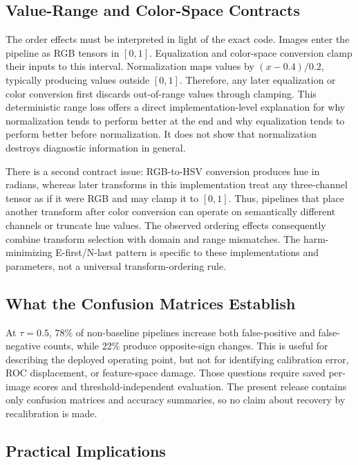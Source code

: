 \documentclass[preprint,review,12pt]{elsarticle}
\begin{document}
\subsection{Value-Range and Color-Space Contracts}
\label{subsec:mechanistic}

The order effects must be interpreted in light of the exact code. Images enter the pipeline as RGB tensors in $[0,1]$. Equalization and color-space conversion clamp their inputs to this interval. Normalization maps values by $(x-0.4)/0.2$, typically producing values outside $[0,1]$. Therefore, any later equalization or color conversion first discards out-of-range values through clamping. This deterministic range loss offers a direct implementation-level explanation for why normalization tends to perform better at the end and why equalization tends to perform better before normalization. It does not show that normalization destroys diagnostic information in general.

There is a second contract issue: RGB-to-HSV conversion produces hue in radians, whereas later transforms in this implementation treat any three-channel tensor as if it were RGB and may clamp it to $[0,1]$. Thus, pipelines that place another transform after color conversion can operate on semantically different channels or truncate hue values. The observed ordering effects consequently combine transform selection with domain and range mismatches. The harm-minimizing E-first/N-last pattern is specific to these implementations and parameters, not a universal transform-ordering rule.

\subsection{What the Confusion Matrices Establish}

At $\tau=0.5$, 78\% of non-baseline pipelines increase both false-positive and false-negative counts, while 22\% produce opposite-sign changes. This is useful for describing the deployed operating point, but not for identifying calibration error, ROC displacement, or feature-space damage. Those questions require saved per-image scores and threshold-independent evaluation. The present release contains only confusion matrices and accuracy summaries, so no claim about recovery by recalibration is made.

\subsection{Practical Implications}
\end{document}
